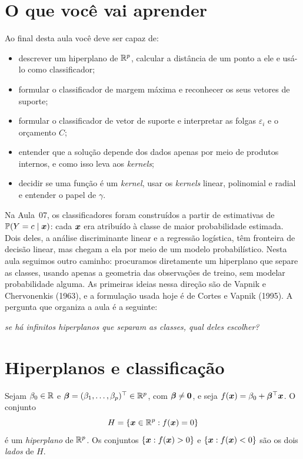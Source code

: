 \documentclass[11pt,a4paper]{article}
\title{}
\date{}
\begin{document}

\section*{O que você vai aprender}
Ao final desta aula você deve ser capaz de:
\begin{itemize}[leftmargin=1.4cm]
  \item descrever um hiperplano de $\mathbb{R}^p$, calcular a distância de um ponto a ele e
        usá-lo como classificador;
  \item formular o classificador de margem máxima e reconhecer os seus vetores de
        suporte;
  \item formular o classificador de vetor de suporte e interpretar as folgas
        $\varepsilon_i$ e o orçamento $C$;
  \item entender que a solução depende dos dados apenas por meio de produtos
        internos, e como isso leva aos \emph{kernels};
  \item decidir se uma função é um \emph{kernel}, usar os \emph{kernels} linear,
        polinomial e radial e entender o papel de $\gamma$.
\end{itemize}

\noindent
Na Aula~07, os classificadores foram construídos a partir de estimativas de
$\mathbb{P}(Y=c\mid\bm{x})$: cada $\bm{x}$ era atribuído à classe de maior probabilidade estimada.
Dois deles, a análise discriminante linear e a regressão logística, têm fronteira de
decisão linear, mas chegam a ela por meio de um modelo probabilístico. Nesta aula
seguimos outro caminho: procuramos diretamente um hiperplano que separe as classes,
usando apenas a geometria das observações de treino, sem modelar probabilidade
alguma. As primeiras ideias nessa direção são de Vapnik e Chervonenkis (1963), e a
formulação usada hoje é de Cortes e Vapnik (1995). A pergunta que organiza a aula é a
seguinte:

\begin{center}\itshape
  se há infinitos hiperplanos que separam as classes, qual deles escolher?
\end{center}

\section{Hiperplanos e classificação}
\begin{definicao}[Hiperplano]
Sejam $\beta_0\in\mathbb{R}$ e $\bm{\beta}=(\beta_1,\dots,\beta_p)^\top\in\mathbb{R}^p$, com
$\bm{\beta}\ne\bm 0$, e seja $f(\bm{x})=\beta_0+\bm{\beta}^\top\bm{x}$. O conjunto
\[
  H=\{\bm{x}\in\mathbb{R}^p : f(\bm{x})=0\}
\]
é um \emph{hiperplano} de $\mathbb{R}^p$. Os conjuntos $\{\bm{x}: f(\bm{x})>0\}$ e
$\{\bm{x}: f(\bm{x})<0\}$ são os dois \emph{lados} de $H$.
\end{definicao}
\end{document}
